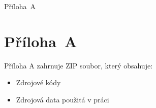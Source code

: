 \documentclass[a4paper, 12pt]{article}
\begin{document}
\noindent Příloha~A \dotfill \pageref{1}


\clearpage {}\label{prilohaA} 
\section*{Příloha~A}

Příloha A zahrnuje ZIP soubor, který obsahuje: 

\begin{itemize}
    \item Zdrojové kódy
    \item Zdrojová data použitá v práci
\end{itemize}

\end{document}
